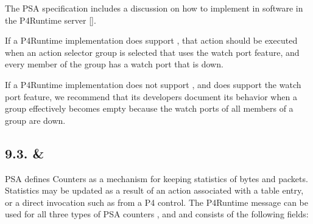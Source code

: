 \documentclass[11pt]{article}
\begin{document}
{%
The PSA specification includes a discussion on how to implement
 in software in the P4Runtime server
[].%

If a P4Runtime implementation does support , that action
should be executed when an action selector group is selected that uses the watch
port feature, and every member of the group has a watch port that is down.%

If a P4Runtime implementation does not support , and
does support the watch port feature, we recommend that its developers document
its behavior when a group effectively becomes empty because the watch ports of
all members of a group are down.%

\subsection{9.3.\hspace*{0.5em} \& }\label{sec-counterentry-directcounterentry}%

\noindent{}PSA defines Counters as a mechanism for keeping statistics of bytes and packets.
Statistics may be updated as a result of an action associated with a table
entry, or a direct invocation such as from a P4 control. The 
P4Runtime message can be used for all three types of PSA counters \textemdash{} ,
 and  \textemdash{} and consists of the following fields:%

}
\end{document}
